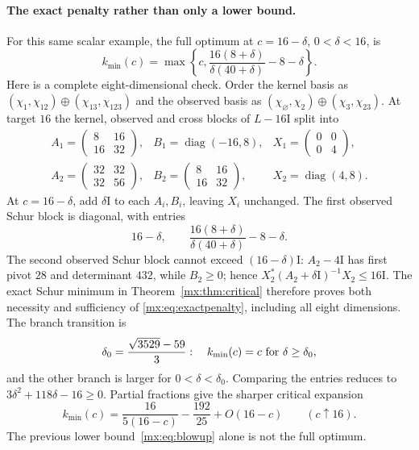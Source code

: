 \documentclass[11pt]{article}
\providecommand{\id}{\mathrm I}
\begin{document}
\paragraph{The exact penalty rather than only a lower bound.}
For this same scalar example, the full optimum at $c=16-\delta$,
$0<\delta<16$, is
\begin{equation}\label{mx:eq:exactpenalty}
 k_{\min}(c)=\max\left\{c,\frac{16(8+\delta)}{\delta(40+\delta)}-8-\delta\right\}.
\end{equation}
Here is a complete eight-dimensional check. Order the kernel basis as
$(\chi_1,\chi_{12})\oplus(\chi_{13},\chi_{123})$ and the observed basis as
$(\chi_\varnothing,\chi_2)\oplus(\chi_3,\chi_{23})$. At target $16$ the
kernel, observed and cross blocks of $L-16\id$ split into
\[
\begin{array}{lll}
 A_1=\begin{pmatrix}8&16\\16&32\end{pmatrix},&
 B_1=\operatorname{diag}(-16,8),&
 X_1=\begin{pmatrix}0&0\\0&4\end{pmatrix},\\[6pt]
 A_2=\begin{pmatrix}32&32\\32&56\end{pmatrix},&
 B_2=\begin{pmatrix}8&16\\16&32\end{pmatrix},&
 X_2=\operatorname{diag}(4,8).
\end{array}
\]
At $c=16-\delta$, add $\delta\id$ to each $A_i,B_i$, leaving $X_i$
unchanged. The first observed Schur block is diagonal, with entries
\[
 16-\delta,\qquad
 \frac{16(8+\delta)}{\delta(40+\delta)}-8-\delta.
\]
The second observed Schur block cannot exceed $(16-\delta)\id$:
$A_2-4\id$ has first pivot $28$ and determinant $432$, while $B_2\geq0$;
hence $X_2^*(A_2+\delta\id)^{-1}X_2\leq16\id$. The exact Schur minimum
in Theorem~\ref{mx:thm:critical} therefore proves both necessity and sufficiency of
\eqref{mx:eq:exactpenalty}, including all eight dimensions.
The branch transition is
\[
 \delta_0=\frac{\sqrt{3529}-59}{3}:
 \quad k_{\min}(c)=c\ \hbox{for }\delta\geq\delta_0,
\]
and the other branch is larger for $0<\delta<\delta_0$. Comparing
the entries reduces to $3\delta^2+118\delta-16\geq0$.
Partial fractions give the sharper critical expansion
\begin{equation}\label{mx:eq:residue}
 k_{\min}(c)=\frac{16}{5(16-c)}-\frac{192}{25}+O(16-c)
 \qquad(c\uparrow16).
\end{equation}
The previous lower bound~\eqref{mx:eq:blowup} alone is not the full optimum.
\end{document}
